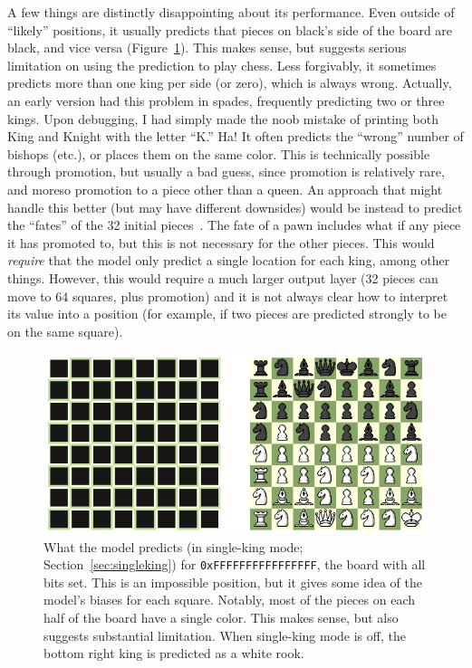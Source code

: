 \documentclass[twocolumn]{amsart}
\begin{document}
A few things are distinctly disappointing about its performance. Even
outside of ``likely'' positions, it usually predicts that pieces on
black's side of the board are black, and vice versa
(Figure~\ref{fig:allon}). This makes sense, but suggests serious
limitation on using the prediction to play chess. Less forgivably, it
sometimes predicts more than one king per side (or zero), which is
always wrong. Actually, an early version had this problem in spades,
frequently predicting two or three kings. Upon debugging, I had simply
made the noob mistake of printing both King and Knight with the letter
``K.'' Ha! It often predicts the ``wrong'' number of bishops (etc.),
or places them on the same color. This is technically possible through
promotion, but usually a bad guess, since promotion is relatively
rare, and moreso promotion to a piece other than a queen. An approach
that might handle this better (but may have different downsides) would
be instead to predict the ``fates'' of the 32 initial
pieces~\cite{survival}. The fate of a pawn includes what if any piece
it has promoted to, but this is not necessary for the other pieces.
This would {\em require} that the model only predict a single location
for each king, among other things. However, this would require a much
larger output layer (32 pieces can move to 64 squares, plus promotion)
and it is not always clear how to interpret its value into a position
(for example, if two pieces are predicted strongly to be on the same
square).

\begin{figure}[ht]
\includegraphics[width=0.9 \linewidth]{blind-allon}
\caption{What the model predicts (in single-king mode;
  Section~\ref{sec:singleking}) for {\tt 0xFFFFFFFFFFFFFFFF}, the board
  with all bits set. This is an impossible position, but it gives some
  idea of the model's biases for each square. Notably, most of the pieces
  on each half of the board have a single color. This makes sense, but
  also suggests substantial limitation. When single-king mode is off,
  the bottom right king is predicted as a white rook.} \label{fig:allon}
\end{figure}
\end{document}
